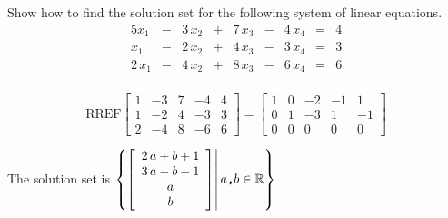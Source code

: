 
\begin{exerciseStatement}


Show how to find the solution set for the following system of linear equations. 
\begin{alignat*}{5} x_{1} &-& 3 \, x_{2} &+& 7 \, x_{3} &-& 4 \, x_{4} &=& 4 \\x_{1} &-& 2 \, x_{2} &+& 4 \, x_{3} &-& 3 \, x_{4} &=& 3 \\2 \, x_{1} &-& 4 \, x_{2} &+& 8 \, x_{3} &-& 6 \, x_{4} &=& 6 \\ \end{alignat*}
            


\end{exerciseStatement}
    
\begin{exerciseAnswer} 
\[\mathrm{RREF} \left[\begin{array}{cccc|c}
1 & -3 & 7 & -4 & 4 \\
1 & -2 & 4 & -3 & 3 \\
2 & -4 & 8 & -6 & 6
\end{array}\right]  =  \left[\begin{array}{cccc|c}
1 & 0 & -2 & -1 & 1 \\
0 & 1 & -3 & 1 & -1 \\
0 & 0 & 0 & 0 & 0
\end{array}\right] \]

The solution set is \( \left\{ \left[\begin{array}{c}
2 \, a + b + 1 \\
3 \, a - b - 1 \\
a \\
b
\end{array}\right] \middle|\,a\text{\texttt{,}}b\in\mathbb{R}\right\} \)


\end{exerciseAnswer}
    
